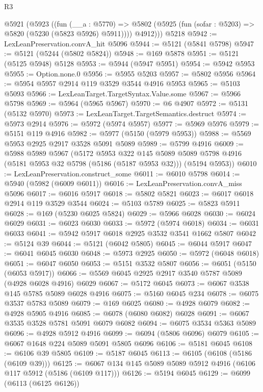 \begin{lexlean}{R3}
\begin{coremodule}
    @5921
      (@5923
        ((fun (__a : @5770) =>
        @5802 (@5925 (fun (sofar : @5203) => @5820 (@5230 (@5823 @5926) @5911))))
          @4912)))
    @5218
@5942 := LexLeanPreservation.convA_hit @5096
@5944 := @5121 (@5841 @5798)
@5947 := @5121 (@5244 (@5802 @5824))
@5948 := @169 @5878
@5951 := @5121 (@5125 @5948) @5128
@5953 := @5944 (@5947 @5951)
@5954 := @5942 @5953
@5955 := Option.none.{0}
@5956 := @5955 @5203
@5957 := @5802 @5956
@5964 := @5954 @5957 @2914 @119 @3529 @3544 @4916 @5953
@5965 := @5103 @5093
@5966 := LexLeanTarget.TargetSyntax.Value.some
@5967 := @5966 @5798
@5969 := @5964 (@5965 @5967)
@5970 := @6 @4907
@5972 := @5131 (@5132 @5970)
@5973 := LexLeanTarget.TargetSemantics.destruct
@5974 := @5973 @2914
@5976 := @5972 (@5974 @5957)
@5977 := @5969 @5976
@5979 := @5151 @119 @4916
@5982 := @5977 (@5150 (@5979 @5953))
@5988 := @5569 @5953 @2925 @2917 @3528 @5091 @5089
@5989 := @5799 @4916
@6009 := @5988
    @5989
    @5967
    (@5172
      @5953
      @322
      @145
      @5089
      @5089
      @5798
      @4916
      (@5181 @5953 @32 @5798 (@5186 (@5187 @5953 @32)))
      (@5194 @5953))
@6010 := LexLeanPreservation.construct_some
@6011 := @6010 @5798
@6014 := @5940 (@5982 (@6009 @6011))
@6016 := LexLeanPreservation.convA_miss @5096
@6017 := @6016 @5917
@6018 := @5802 @5821
@6023 := @6017 @6018 @2914 @119 @3529 @3544
@6024 := @5103 @5789
@6025 := @5823 @5911
@6028 := @169 (@5230 @6025 @5824)
@6029 := @5966 @6028
@6030 := @6024 @6029
@6031 := @6023 @6030
@6033 := @5972 (@5974 @6018)
@6034 := @6031 @6033
@6041 := @5942 @5917 @6018 @2925 @3532 @3541 @1662 @5807
@6042 := @5124 @39
@6044 := @5121 (@6042 @5805)
@6045 := @6044 @5917
@6047 := @6041 @6045 @6030
@6048 := @5973 @2925
@6050 := @5972 (@6048 @6018)
@6051 := @6047 @6050
@6053 := @5151 @3532 @5807
@6056 := @6051 (@5150 (@6053 @5917))
@6066 := @5569 @6045 @2925 @2917 @3540 @5787 @5089 (@4928 @6028 @4916) @6029
@6067 := @5172 @6045
@6073 := @6067 @3538 @145 @5785 @5089 @6028 @4916
@6075 := @5160 @6045 @234
@6078 := @6075 @3537 @5783 @5089
@6079 := @169 @6025
@6080 := @4928 @6079
@6082 := @4928 @5905 @4916
@6085 := @6078 (@6080 @6082) @6028
@6091 := @6067 @3535 @3528 @5781 @5091 @6079 @6082
@6094 := @6075 @3534 @5363 @5089
@6096 := @4928 @5912 @4916
@6099 := @6094 (@5806 @6096) @6079
@6105 := @6067 @1648 @224 @5089 @5091 @5805 @6096
@6106 := @5181 @6045
@6108 := @6106 @39 @5805
@6109 := @5187 @6045
@6113 := @6105 (@6108 (@5186 (@6109 @39)))
@6125 := @6067 @134 @145 @5089 @5089 @5912 @4916 (@6106 @117 @5912 (@5186 (@6109 @117)))
@6126 := @5194 @6045
@6129 := @6099 (@6113 (@6125 @6126))

\end{coremodule}
\end{lexlean}
